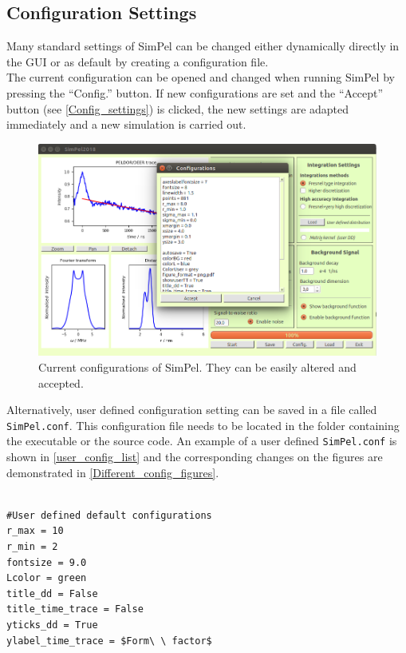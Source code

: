 \documentclass[pdftex,bezier,german,a4,twoside, headexclude,12pt,nochapterprefix, titlepage]{extarticle}
\newcommand{\simpel}{\textsf{SimPel}}
\begin{document}
\subsection{Configuration Settings}
Many standard settings of \simpel{} can be changed either dynamically directly in the GUI or as default by creating a
configuration file.\\
The current configuration can be opened and changed when running  \simpel{} by pressing the ``Config.'' button.
If new configurations are set and the ``Accept'' button (see \autoref{Config_settings})
is clicked, the new settings are adapted immediately and a new simulation is carried out.
\begin{figure}[!htb]
\centering
\includegraphics[scale=0.5]{Config_example.png}
    \caption{Current configurations of  \simpel. They can be easily altered and accepted.}
   \label{Config_settings}
\end{figure}
Alternatively, user defined configuration setting can be saved in a file called \texttt{SimPel.conf}. This configuration file
needs to be located in the folder containing the executable or the source code. An example of a user defined \texttt{SimPel.conf} is
shown in \autoref{user_config_list} and the corresponding changes on the figures are demonstrated in \autoref{Different_config_figures}.
\newpage
\begin{lstlisting}[caption={Example for a user defined configuration file (\texttt{SimPel.conf}).},label = user_config_list]

#User defined default configurations 
r_max = 10
r_min = 2
fontsize = 9.0
Lcolor = green
title_dd = False
title_time_trace = False
yticks_dd = True
ylabel_time_trace = $Form\ \ factor$
\end{lstlisting}
\end{document}
